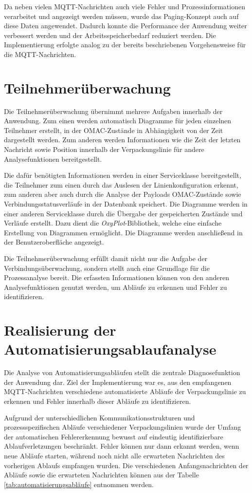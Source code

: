 Da neben vielen MQTT-Nachrichten auch viele Fehler und Prozessinformationen verarbeitet und angezeigt werden müssen, wurde das Paging-Konzept auch auf diese Daten angewendet. Dadurch konnte die Performance der Anwendung weiter verbessert werden und der Arbeitsspeicherbedarf reduziert werden. Die Implementierung erfolgte analog zu der bereits beschriebenen Vorgehensweise für die MQTT-Nachrichten.
\section{Teilnehmerüberwachung}
Die Teilnehmerüberwachung übernimmt mehrere Aufgaben innerhalb der Anwendung. Zum einen werden automatisch Diagramme für jeden einzelnen Teilnehmer erstellt, in der OMAC-Zustände in Abhängigkeit von der Zeit dargestellt werden. Zum anderen werden Informationen wie die Zeit der letzten Nachricht sowie Position innerhalb der Verpackungslinie für andere Analysefunktionen bereitgestellt.

Die dafür benötigten Informationen werden in einer Serviceklasse bereitgestellt, die Teilnehmer zum einen durch das Auslesen der Linienkonfiguration erkennt, zum anderen aber auch durch die Analyse der Payloads OMAC-Zustände sowie Verbindungsstatusverläufe in der Datenbank speichert. Die Diagramme werden in einer anderen Serviceklasse durch die Übergabe der gespeicherten Zustände und Verläufe erstellt. Dazu dient die \textit{OxyPlot}-Bibliothek, welche eine einfache Erstellung von Diagrammen ermöglicht. Die Diagramme werden anschließend in der Benutzeroberfläche angezeigt.

Die Teilnehmerüberwachung erfüllt damit nicht nur die Aufgabe der Verbindungsüberwachung, sondern stellt auch eine Grundlage für die Prozessanalyse bereit. Die erfassten Informationen können von den anderen Analysefunktionen genutzt werden, um Abläufe zu erkennen und Fehler zu identifizieren.
\section{Realisierung der Automatisierungsablaufanalyse}
Die Analyse von Automatisierungsabläufen stellt die zentrale Diagnosefunktion der Anwendung dar. Ziel der Implementierung war es, aus den empfangenen MQTT-Nachrichten verschiedene automatisierte Abläufe der Verpackungslinie zu erkennen und Fehler innerhalb dieser Abläufe zu identifizieren. 

Aufgrund der unterschiedlichen Kommunikationsstrukturen und prozessspezifischen Abläufe verschiedener Verpackungslinien wurde der Umfang der automatischen Fehlererkennung bewusst auf eindeutig identifizierbare Ablaufverletzungen beschränkt. Fehler können nur dann erkannt werden, wenn neue Abläufe starten, während noch nicht alle erwarteten Nachrichten des vorherigen Ablaufs empfangen wurden. Die verschiedenen Anfangsnachrichten der Abläufe sowie die erwarteten Nachrichten können aus der Tabelle \ref{tab:automatisierungsabläufe} entnommen werden.


